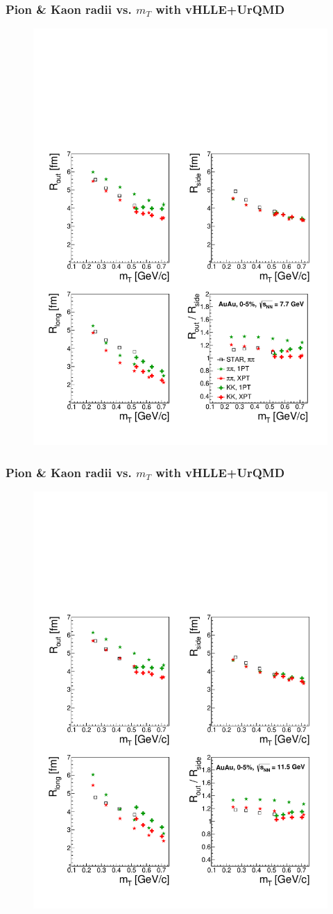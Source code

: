 \documentclass[dvipsnames] {beamer}
\begin{document}
      \begin{frame}
        \frametitle{\bf \centering Pion \& Kaon radii vs. $m_{T}$ with vHLLE+UrQMD}
        \begin{figure}[H]
            \includegraphics[width=.68\linewidth]{AuAu_077.pdf}
        \end{figure}
      \end{frame}

       \begin{frame}
        \frametitle{\bf \centering Pion \& Kaon radii vs. $m_{T}$ with vHLLE+UrQMD}
        \begin{figure}[H]
          \includegraphics[width=.68\linewidth]{AuAu_115.pdf}
        \end{figure}
       \end{frame}
      
\end{document}
